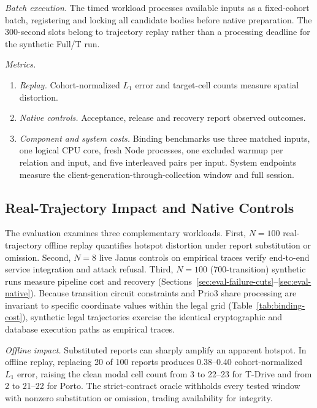 \documentclass[conference,compsoc]{IEEEtran}
\theoremstyle{definition}
\numberwithin{equation}{section}
\numberwithin{table}{section}
\numberwithin{figure}{section}
\theoremstyle{plain}
\begin{document}
\emph{Batch execution.} The timed workload processes available inputs as a fixed-cohort batch, registering and locking all candidate bodies before native preparation. The 300-second slots belong to trajectory replay rather than a processing deadline for the synthetic Full/T run.

\emph{Metrics.}
\begin{enumerate}
\setlength{\itemsep}{0pt}\setlength{\parskip}{0pt}\setlength{\topsep}{0pt}
\item \emph{Replay.} Cohort-normalized \(L_1\) error and target-cell counts measure spatial distortion.
\item \emph{Native controls.} Acceptance, release and recovery report observed outcomes.
\item \emph{Component and system costs.} Binding benchmarks use three matched inputs, one logical CPU core, fresh Node processes, one excluded warmup per relation and input, and five interleaved pairs per input. System endpoints measure the client-generation-through-collection window and full session.
\end{enumerate}

\subsection{Real-Trajectory Impact and Native Controls}
\label{sec:eval-real-traces}

The evaluation examines three complementary workloads.
First, $N = 100$ real-trajectory offline replay quantifies hotspot distortion under report substitution or omission.
Second, $N = 8$ live Janus controls on empirical traces verify end-to-end service integration and attack refusal.
Third, $N = 100$ (700-transition) synthetic runs measure pipeline cost and recovery (Sections~\ref{sec:eval-failure-cuts}--\ref{sec:eval-native}).
Because transition circuit constraints and Prio3 share processing are invariant to specific coordinate values within the legal grid (Table~\ref{tab:binding-cost}), synthetic legal trajectories exercise the identical cryptographic and database execution paths as empirical traces.

\emph{Offline impact.} Substituted reports can sharply amplify an apparent hotspot.
In offline replay, replacing 20 of 100 reports produces 0.38--0.40 cohort-normalized \(L_1\) error, raising the clean modal cell count from 3 to 22--23 for T-Drive and from 2 to 21--22 for Porto. The strict-contract oracle withholds every tested window with nonzero substitution or omission, trading availability for integrity.
\end{document}
